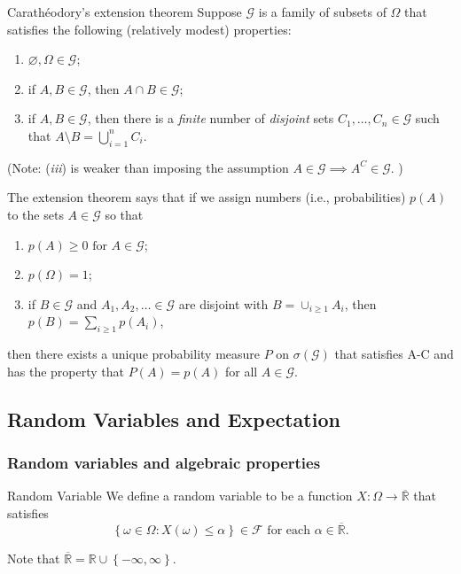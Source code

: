 \begin{thrm}{Carathéodory's extension theorem}{}
Suppose \( \mathcal{G}  \) is a family of subsets of \( \Omega  \) that satisfies the following (relatively modest) properties:
\begin{enumerate}[label = \emph{\roman*.)}]
    \item \( \varnothing , \Omega \in \mathcal{G}  \);
    \item if \( A, B \in \mathcal{G}  \), then \( A \cap B \in \mathcal{G}  \);
    \item if \( A,B \in \mathcal{G}  \), then there is a \emph{finite} number of \emph{disjoint} sets \( C_1 ,\dots , C_{n} \in  \mathcal{G}   \) such that \( A \setminus B = \bigcup_{i=1}^{n} C_{i}  \).
\end{enumerate}
(Note: (\emph{iii}) is weaker than imposing the assumption \( A \in \mathcal{G} \implies A^{C} \in  \mathcal{G}  \). )

The extension theorem says that if we assign numbers (i.e., probabilities) \( p(A) \) to the sets \( A \in \mathcal{G}  \) so that 

\begin{enumerate}[label = \Alph*.]
    \item \( p(A) \geq 0 \text{ for } A \in \mathcal{G}   \); 
    \item \( p(\Omega ) = 1\);
    \item if \( B \in \mathcal{G}  \)  and \( A_1, A_2, \dots  \in \mathcal{G} \) are disjoint with \( B = \cup_{i\geq 1}A_{i}   \), then \( p(B) = \sum_{i\geq 1}p(A_{i} )  \), 
\end{enumerate}
then there exists a unique probability measure \( P \) on \( \sigma (\mathcal{G} ) \) that satisfies A-C and has the property that \( P(A) = p(A)  \) for all \( A \in \mathcal{G}  \).
\end{thrm}

\subsection{Random Variables and Expectation}

\subsubsection{Random variables and algebraic properties}


\begin{defn}{Random Variable}{}
    We define a random variable to be a function \( X: \Omega \to \overline{\mathbb{R}}  \) that satisfies
    \[
        \left\{ \omega \in \Omega : X(\omega )\leq \alpha  \right\} \in \mathcal{F} \text{ for each } \alpha \in \overline{\mathbb{R} }.   
    \]
    
    Note that \( \overline{\mathbb{R} } = \mathbb{R} \cup \left\{ - \infty , \infty  \right\}   \). 
    \end{defn}

